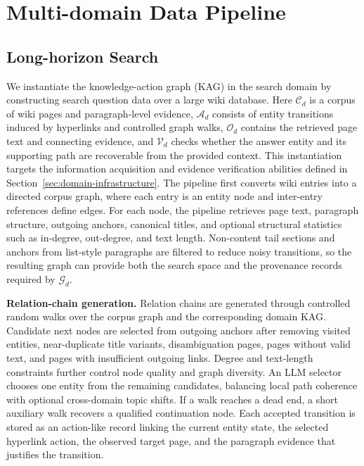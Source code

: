 \section{Multi-domain Data Pipeline}
\subsection{Long-horizon Search}
\label{sec:search_data}
We instantiate the knowledge-action graph (KAG) in the search domain by constructing search question data over a large wiki database. Here $\mathcal{C}_d$ is a corpus of wiki pages and paragraph-level evidence, $\mathcal{A}_d$ consists of entity transitions induced by hyperlinks and controlled graph walks, $\mathcal{O}_d$ contains the retrieved page text and connecting evidence, and $\mathcal{V}_d$ checks whether the answer entity and its supporting path are recoverable from the provided context. This instantiation targets the information acquisition and evidence verification abilities defined in Section~\ref{sec:domain-infrastructure}. The pipeline first converts wiki entries into a directed corpus graph, where each entry is an entity node and inter-entry references define edges. For each node, the pipeline retrieves page text, paragraph structure, outgoing anchors, canonical titles, and optional structural statistics such as in-degree, out-degree, and text length. Non-content tail sections and anchors from list-style paragraphs are filtered to reduce noisy transitions, so the resulting graph can provide both the search space and the provenance records required by $\mathcal{G}_d$.

\textbf{Relation-chain generation.} Relation chains are generated through controlled random walks over the corpus graph and the corresponding domain KAG. Candidate next nodes are selected from outgoing anchors after removing visited entities, near-duplicate title variants, disambiguation pages, pages without valid text, and pages with insufficient outgoing links. Degree and text-length constraints further control node quality and graph diversity. An LLM selector chooses one entity from the remaining candidates, balancing local path coherence with optional cross-domain topic shifts. If a walk reaches a dead end, a short auxiliary walk recovers a qualified continuation node. Each accepted transition is stored as an action-like record linking the current entity state, the selected hyperlink action, the observed target page, and the paragraph evidence that justifies the transition.

